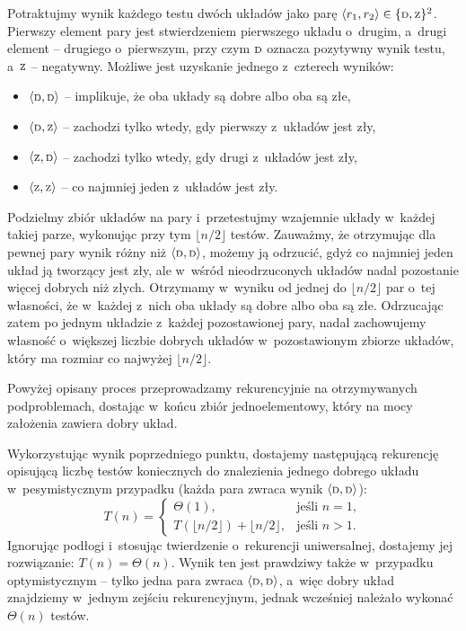 \subproblem %
Potraktujmy wynik każdego testu dwóch układów jako parę $\langle r_1,r_2\rangle\in\{{\scriptstyle\rm D},{\scriptstyle\rm Z}\}^2$. Pierwszy element pary jest stwierdzeniem pierwszego układu o~drugim, a~drugi element -- drugiego o~pierwszym, przy czym ${\scriptstyle\rm D}$ oznacza pozytywny wynik testu, a~${\scriptstyle\rm Z}$ -- negatywny. Możliwe jest uzyskanie jednego z~czterech wyników:
\begin{itemize}
	\item $\langle{\scriptstyle\rm D},{\scriptstyle\rm D}\rangle$ -- implikuje, że oba układy są dobre albo oba są złe,
	\item $\langle{\scriptstyle\rm D},{\scriptstyle\rm Z}\rangle$ -- zachodzi tylko wtedy, gdy pierwszy z~układów jest zły,
	\item $\langle{\scriptstyle\rm Z},{\scriptstyle\rm D}\rangle$ -- zachodzi tylko wtedy, gdy drugi z~układów jest zły,
	\item $\langle{\scriptstyle\rm Z},{\scriptstyle\rm Z}\rangle$ -- co najmniej jeden z~układów jest zły.
\end{itemize}

Podzielmy zbiór układów na pary i~przetestujmy wzajemnie układy w~każdej takiej parze, wykonując przy tym $\lfloor n/2\rfloor$ testów. Zauważmy, że otrzymując dla pewnej pary wynik różny niż $\langle{\scriptstyle\rm D},{\scriptstyle\rm D}\rangle$, możemy ją odrzucić, gdyż co najmniej jeden układ ją tworzący jest zły, ale w~wśród nieodrzuconych układów nadal pozostanie więcej dobrych niż złych. Otrzymamy w~wyniku od jednej do $\lfloor n/2\rfloor$ par o~tej własności, że w~każdej z~nich oba układy są dobre albo oba są złe. Odrzucając zatem po jednym układzie z~każdej pozostawionej pary, nadal zachowujemy własność o~większej liczbie dobrych układów w~pozostawionym zbiorze układów, który ma rozmiar co najwyżej $\lfloor n/2\rfloor$.

Powyżej opisany proces przeprowadzamy rekurencyjnie na otrzymywanych podproblemach, dostając w~końcu zbiór jednoelementowy, który na mocy założenia zawiera dobry układ.

\subproblem %
Wykorzystując wynik poprzedniego punktu, dostajemy następującą rekurencję opisującą liczbę testów koniecznych do znalezienia jednego dobrego układu w~pesymistycznym przypadku (każda para zwraca wynik $\langle{\scriptstyle\rm D},{\scriptstyle\rm D}\rangle$):
\[
	T(n) =
	\begin{cases}
		\Theta(1), & \text{jeśli $n=1$}, \\
		T(\lfloor n/2\rfloor) + \lfloor n/2\rfloor, & \text{jeśli $n>1$}.
	\end{cases}
\]
Ignorując podłogi i~stosując twierdzenie o~rekurencji uniwersalnej, dostajemy jej rozwiązanie: $T(n)=\Theta(n)$. Wynik ten jest prawdziwy także w~przypadku optymistycznym -- tylko jedna para zwraca $\langle{\scriptstyle\rm D},{\scriptstyle\rm D}\rangle$, a~więc dobry układ znajdziemy w~jednym zejściu rekurencyjnym, jednak wcześniej należało wykonać $\Theta(n)$ testów.

